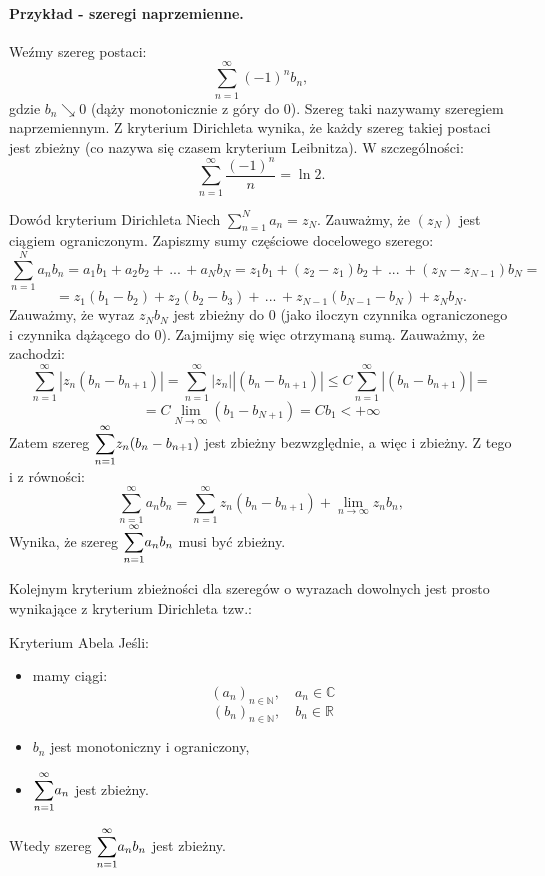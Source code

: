 \documentclass{article}
\numberwithin{defi}{section}
\numberwithin{theo}{section}
\numberwithin{defi}{section}
\newcommand{\R}{\mathbb{R}}
\newcommand{\N}{\mathbb{N}}
\newcommand{\C}{\mathbb{C}}
\newcommand{\oo}{\infty}
\begin{document}
\paragraph{Przykład - szeregi naprzemienne.} Weźmy szereg postaci:
\[\sum_{n=1}^{\oo} (-1)^n b_n,\]
gdzie $b_n \searrow 0$ (dąży monotonicznie z góry do 0). Szereg taki nazywamy szeregiem naprzemiennym. Z kryterium Dirichleta wynika, że każdy szereg takiej postaci jest zbieżny (co nazywa się czasem kryterium Leibnitza). W szczególności:
\[\sum_{n=1}^{\oo} \frac{(-1)^n}{n} = \ln 2.\]
\begin{dow}{Dowód kryterium Dirichleta}
    Niech $\sum_{n=1}^{N} a_n = z_N$. Zauważmy, że $(z_N)$ jest ciągiem ograniczonym. Zapiszmy sumy częściowe docelowego szerego:
    \[\sum_{n=1}^{N} a_n b_n = a_1 b_1 + a_2 b_2 + \, ... \, + a_N b_N = z_1 b_1 + (z_2 - z_1) b_2 + \, ... \, +  (z_N - z_{N-1}) b_N = \]
    \[ = z_1 (b_1 - b_2) + z_2 (b_2 - b_3) + \, ... \, + z_{N-1} (b_{N-1} - b_N) + z_N b_N.\]
    Zauważmy, że wyraz $z_N b_N$ jest zbieżny do 0 (jako iloczyn czynnika ograniczonego i czynnika dążącego do 0).
    Zajmijmy się więc otrzymaną sumą. Zauważmy, że zachodzi:
    \[\sum_{n=1}^{\oo} | z_n (b_n - b_{n+1} )| = \sum_{n=1}^{\oo} | z_n| | (b_n - b_{n+1} )| \leqslant  C \sum_{n=1}^{\oo} | (b_n - b_{n+1} )| =\]
    \[= C \lim_{N\to \oo} (b_1 - b_{N+1}) = C b_1 < + \oo\]
    Zatem szereg $\mathlarger{\sum}_{n=1}^{\oo} z_n ( b_n - b_{n+1})$ jest zbieżny bezwzględnie, a więc i zbieżny.
    Z tego i z równości:
    \[\sum_{n=1}^{\oo} a_n b_n = \sum_{n=1}^{\oo} z_n ( b_n - b_{n+1}) + \lim _{n \to \oo} z_n b_n, \]
    Wynika, że szereg $\mathlarger{\sum}_{n=1}^{\oo} a_n b_n$ musi być zbieżny.
\end{dow}
Kolejnym kryterium zbieżności dla szeregów o wyrazach dowolnych jest prosto wynikające z kryterium Dirichleta tzw.:
\begin{twier}{Kryterium Abela}
    Jeśli:
    \begin{itemize}
        \item mamy ciągi:
              \[(a_n)_{n\in \N}, \quad a_n \in \C \]
              \[(b_n)_{n\in \N}, \quad b_n \in \R\]
        \item $b_n$ jest monotoniczny i ograniczony,
        \item $\mathlarger{\sum}_{n=1}^{\oo} a_n$ jest zbieżny.
    \end{itemize}
    Wtedy szereg $\mathlarger{\sum}_{n=1}^{\oo} a_n b_n$ jest zbieżny.
\end{twier}
\end{document}
